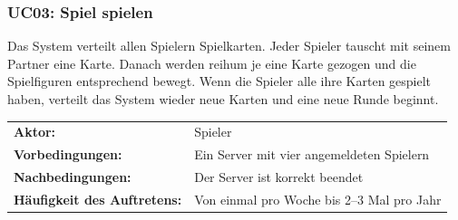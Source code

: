 \documentclass[12pt,halfparskip]{scrartcl}
\begin{document}
\subsubsection{UC03: Spiel spielen}\label{ssub:uc03_spiel_erstellen}
Das System verteilt allen Spielern Spielkarten. Jeder Spieler tauscht mit seinem Partner eine Karte. Danach werden reihum je eine Karte gezogen und die Spielfiguren entsprechend bewegt. Wenn die Spieler alle ihre Karten gespielt haben, verteilt das System wieder neue Karten und eine neue Runde beginnt. 

\begin{tabular}{@{} l l @{}}
	\textbf{Aktor:}														&	Spieler \\
	\textbf{Vorbedingungen:}									& Ein Server mit vier angemeldeten Spielern \\
	\textbf{Nachbedingungen:}									& Der Server ist korrekt beendet \\
	\textbf{Häufigkeit des Auftretens:}				& Von einmal pro Woche bis 2--3 Mal pro Jahr \\
\end{tabular}
\newpage
\end{document}
